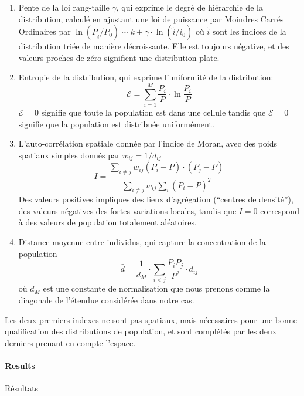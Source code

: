 {\begin{enumerate}
\item Pente de la loi rang-taille $\gamma$, qui exprime le degré de hiérarchie de la distribution, calculé en ajustant une loi de puissance par Moindres Carrés Ordinaires par $\ln \left( P_{\tilde{i}}/P_0\right) \sim k + \gamma\cdot \ln \left(\tilde{i}/i_0\right)$ où $\tilde{i}$ sont les indices de la distribution triée de manière décroissante. Elle est toujours négative, et des valeurs proches de zéro signifient une distribution plate.
\item Entropie de la distribution, qui exprime l'uniformité de la distribution:
\begin{equation}
\mathcal{E} = \sum_{i=1}^{M}\frac{P_i}{P}\cdot \ln{\frac{P_i}{P}}
\end{equation}
$\mathcal{E}=0$ signifie que toute la population est dans une cellule tandis que $\mathcal{E}=0$ signifie que la population est distribuée uniformément.
\item L'auto-corrélation spatiale donnée par l'indice de Moran, avec des poids spatiaux simples donnés par $w_{ij} = 1/d_{ij}$
\[
I = \frac{\sum_{i\neq j} w_{ij} \left(P_i - \bar{P}\right)\cdot\left(P_j - \bar{P}\right)}{\sum_{i\neq j} w_{ij} \sum_{i}{\left( P_i - \bar{P}\right)}^2}
\]
Des valeurs positives impliques des lieux d'agrégation (``centres de densité''), des valeurs négatives des fortes variations locales, tandis que $I=0$ correspond à des valeurs de population totalement aléatoires.
\item Distance moyenne entre individus, qui capture la concentration de la population
\[
\bar{d} = \frac{1}{d_M}\cdot \sum_{i<j} \frac{P_i P_j}{P^2} \cdot d_{ij}
\]
où $d_M$ est une constante de normalisation que nous prenons comme la diagonale de l'étendue considérée dans notre cas.
\end{enumerate}
}

Les deux premiers indexes ne sont pas spatiaux, mais nécessaires pour une bonne qualification des distributions de population, et sont complétés par les deux derniers prenant en compte l'espace.


\paragraph{Results}{Résultats}



